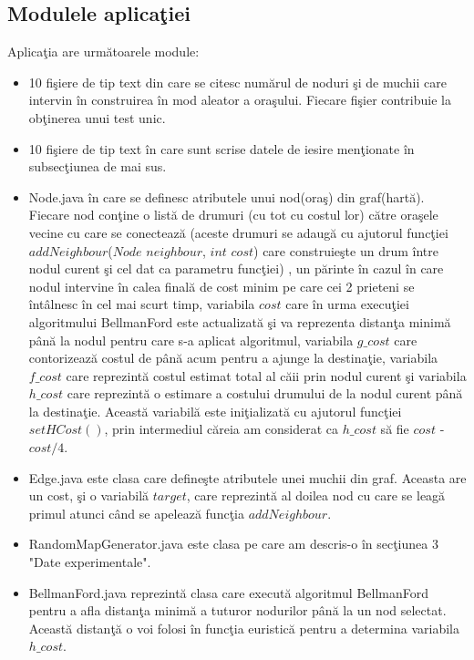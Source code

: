\documentclass{article}
\begin{document}
\subsection{Modulele aplica\c{t}iei}
Aplica\c{t}ia are urm\u{a}toarele module:
\begin{itemize}
    \item 10 fi\c{s}iere de tip text din care se citesc num\u{a}rul de noduri \c{s}i de muchii care intervin \^{i}n construirea \^{i}n mod aleator a ora\c{s}ului. Fiecare fi\c{s}ier contribuie la ob\c{t}inerea unui test unic.
    \item 10 fi\c{s}iere de tip text \^{i}n care sunt scrise datele de iesire men\c{t}ionate \^{i}n subsec\c{t}iunea de mai sus.
    \item Node.java \^{i}n care se definesc atributele unui nod(ora\c{s}) din graf(hart\u{a}). Fiecare nod con\c{t}ine o list\u{a} de drumuri (cu tot cu costul lor) c\u{a}tre ora\c{s}ele vecine cu care se conecteaz\u{a} (aceste drumuri se adaug\u{a} cu ajutorul func\c{t}iei $addNeighbour$($Node$ $neighbour$, $int$ $cost$) care construie\c{s}te un drum \^{i}ntre nodul curent \c{s}i cel dat ca parametru func\c{t}iei) , un p\u{a}rinte \^{i}n cazul \^{i}n care nodul intervine \^{i}n calea final\u{a} de cost minim pe care cei 2 prieteni se \^{i}nt\^{a}lnesc \^{i}n cel mai scurt timp, variabila $cost$ care \^{i}n urma execu\c{t}iei algoritmului BellmanFord este actualizat\u{a} \c{s}i va reprezenta distan\c{t}a minim\u{a} p\^{a}n\u{a} la nodul pentru care s-a aplicat algoritmul, variabila $g\_cost$ care contorizeaz\u{a} costul de p\^{a}n\u{a} acum pentru a ajunge la destina\c{t}ie, variabila $f\_cost$ care reprezint\u{a} costul estimat total al c\u{a}ii prin nodul curent \c{s}i variabila $h\_cost$ care reprezint\u{a} o estimare a costului drumului de la nodul curent p\^{a}n\u{a} la destina\c{t}ie. Aceast\u{a} variabil\u{a} este ini\c{t}ializat\u{a} cu ajutorul func\c{t}iei $setHCost()$, prin intermediul c\u{a}reia am considerat ca $h\_cost$ s\u{a} fie $cost$ - $cost/4$.
    \item Edge.java este clasa care define\c{s}te atributele unei muchii din graf. Aceasta are un cost, \c{s}i o variabil\u{a} $target$, care reprezint\u{a} al doilea nod cu care se leag\u{a} primul atunci c\^{a}nd se apeleaz\u{a} func\c{t}ia $addNeighbour$. 
    \item RandomMapGenerator.java este clasa pe care am descris-o \^{i}n sec\c{t}iunea 3 "Date experimentale".
    \item BellmanFord.java reprezint\u{a} clasa care execut\u{a} algoritmul BellmanFord pentru a afla distan\c{t}a minim\u{a} a tuturor nodurilor p\^{a}n\u{a} la un nod selectat. Aceast\u{a} distan\c{t}\u{a} o voi folosi \^{i}n func\c{t}ia euristic\u{a} pentru a determina variabila $h\_cost$.

\end{itemize}
\end{document}
